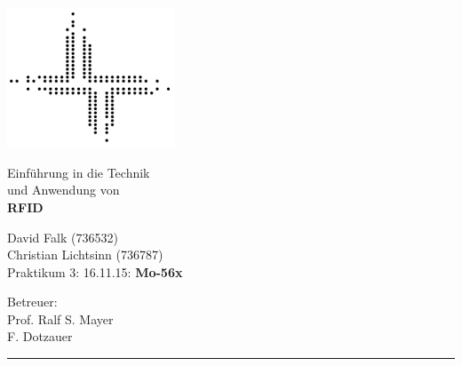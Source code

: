 \documentclass[paper=a4,fontsize=11pt,headsepline,footsepline,parskip=half]{scrartcl}
\begin{document}
\begin{titlepage}

\begin{minipage}[c]{5cm}
\includegraphics[width=5cm]{../logofbi}
\end{minipage}
\hfill
\begin{minipage}[c]{10cm}
\begin{flushright}
\Large Einführung in die Technik\\und Anwendung von\\
\LARGE \textbf{RFID}
\end{flushright}
\end{minipage}

\vspace*{1cm}

\begin{minipage}[c]{9cm}
\begin{flushleft}
\large David Falk (736532)\\Christian Lichtsinn (736787)\\Praktikum 3: 16.11.15: \textbf{Mo-56x}
\end{flushleft}
\end{minipage}
\hfill
\begin{minipage}[c]{7cm}
\begin{flushright}
\large Betreuer:\\Prof. Ralf S. Mayer\\F. Dotzauer
\end{flushright}
\end{minipage}

\vspace*{1cm}

\begingroup
  \setlength{\parskip}{0pt}%
  \setlength{\parindent}{0pt}%
  \setlength{\parfillskip}{0pt plus 1fil}%
  \par\rule{\linewidth}{1.5pt}\par
\endgroup

\vspace*{1cm}


\end{titlepage}
\end{document}
